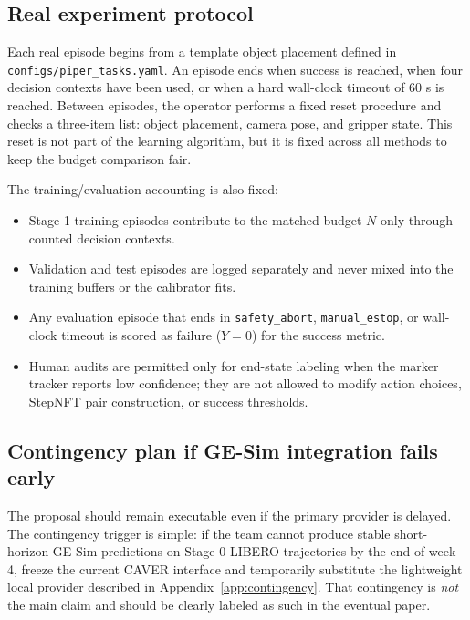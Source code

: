 \documentclass[10pt]{article}
\theoremstyle{plain}
\theoremstyle{definition}
\theoremstyle{remark}
\begin{document}
\subsection{Real experiment protocol}
Each real episode begins from a template object placement defined in \texttt{configs/piper\_tasks.yaml}. An episode ends when success is reached, when four decision contexts have been used, or when a hard wall-clock timeout of 60 s is reached. Between episodes, the operator performs a fixed reset procedure and checks a three-item list: object placement, camera pose, and gripper state. This reset is not part of the learning algorithm, but it is fixed across all methods to keep the budget comparison fair.

The training/evaluation accounting is also fixed:
\begin{itemize}
    \item Stage-1 training episodes contribute to the matched budget $N$ only through counted decision contexts.
    \item Validation and test episodes are logged separately and never mixed into the training buffers or the calibrator fits.
    \item Any evaluation episode that ends in \texttt{safety\_abort}, \texttt{manual\_estop}, or wall-clock timeout is scored as failure ($Y=0$) for the success metric.
    \item Human audits are permitted only for end-state labeling when the marker tracker reports low confidence; they are not allowed to modify action choices, StepNFT pair construction, or success thresholds.
\end{itemize}

\subsection{Contingency plan if GE-Sim integration fails early}
The proposal should remain executable even if the primary provider is delayed. The contingency trigger is simple: if the team cannot produce stable short-horizon GE-Sim predictions on Stage-0 LIBERO trajectories by the end of week 4, freeze the current CAVER interface and temporarily substitute the lightweight local provider described in Appendix~\ref{app:contingency}. That contingency is \emph{not} the main claim and should be clearly labeled as such in the eventual paper.
\end{document}
